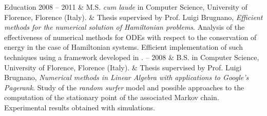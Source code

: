 \begin{cvsection}{Education}
2008 -- 2011 & M.S. \emph{cum laude} in Computer Science, University of Florence, Florence (Italy).\spacednewline
	& Thesis supervised by Prof. Luigi Brugnano, \emph{Efficient methods for the numerical solution of Hamiltonian problems}.
	Analysis of the effectiveness of numerical methods for ODEs with respect to the conservation of energy in the case of Hamiltonian systems. Efficient implementation of such techniques using a framework developed in . -- 2008 & B.S. in Computer Science, University of Florence, Florence (Italy).\spacednewline
	& Thesis supervised by Prof. Luigi Brugnano, \emph{Numerical methods in Linear Algebra with applications to Google's Pagerank}. Study of the \emph{random surfer} model and possible approaches to the computation of the stationary point of the associated Markov chain. Experimental results obtained with  simulations.
\end{cvsection}